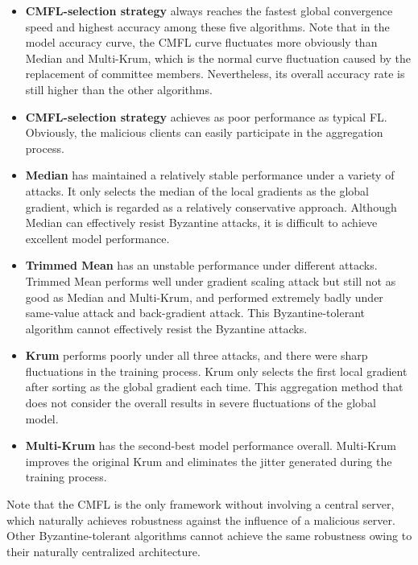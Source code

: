 \documentclass[10pt,journal,compsoc]{IEEEtran}
\begin{document}
\begin{itemize}
\item \textbf{CMFL-selection strategy \uppercase\expandafter{}} always reaches the fastest global convergence speed and highest accuracy among these five algorithms. Note that in the model accuracy curve, the CMFL curve fluctuates more obviously than Median and Multi-Krum, which is the normal curve fluctuation caused by the replacement of committee members. Nevertheless, its overall accuracy rate is still higher than the other algorithms.
\item \textbf{CMFL-selection strategy \uppercase\expandafter{}} achieves as poor performance as typical FL. Obviously, the malicious clients can easily participate in the aggregation process.
\item \textbf{Median}\cite{pmlr-v80-yin18a} has maintained a relatively stable performance under a variety of attacks. It only selects the median of the local gradients as the global gradient, which is regarded as a relatively conservative approach. Although Median can effectively resist Byzantine attacks, it is difficult to achieve excellent model performance.
\item \textbf{Trimmed Mean}\cite{pmlr-v80-yin18a} has an unstable performance under different attacks. Trimmed Mean performs well under gradient scaling attack but still not as good as Median and Multi-Krum, and performed extremely badly under same-value attack and back-gradient attack. This Byzantine-tolerant algorithm cannot effectively resist the Byzantine attacks. 
\item \textbf{Krum}\cite{Blanchard2017Byzantine} performs poorly under all three attacks, and there were sharp fluctuations in the training process. Krum only selects the first local gradient after sorting as the global gradient each time. This aggregation method that does not consider the overall results in severe fluctuations of the global model.
\item \textbf{Multi-Krum}\cite{Blanchard2017Byzantine} has the second-best model performance overall. Multi-Krum improves the original Krum and eliminates the jitter generated during the training process. 
\end{itemize}

Note that the CMFL is the only framework without involving a central server, which naturally achieves robustness against the influence of a malicious server. Other Byzantine-tolerant algorithms cannot achieve the same robustness owing to their naturally centralized architecture.
\end{document}
